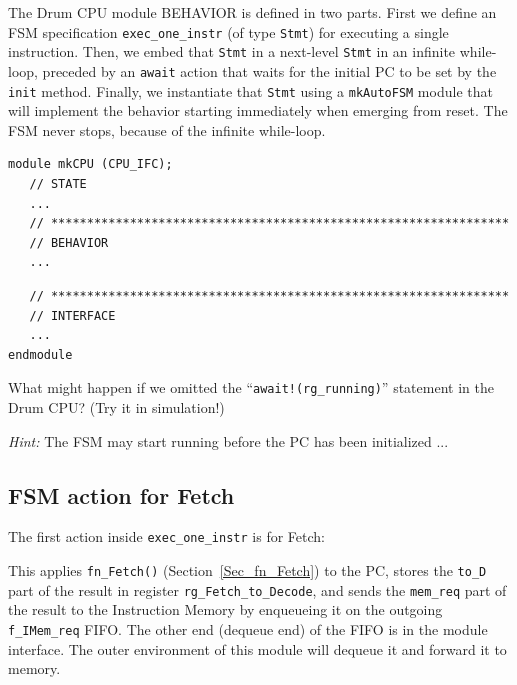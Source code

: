 The Drum CPU module BEHAVIOR is defined in two parts.  First we define
an FSM specification \verb|exec_one_instr| (of type \verb|Stmt|) for
executing a single instruction.  Then, we embed that \verb|Stmt| in a
next-level \verb|Stmt| in an infinite while-loop, preceded by an
\verb|await| action that waits for the initial PC to be set by the
\verb|init| method. Finally, we instantiate that \verb|Stmt| using a
\verb|mkAutoFSM| module that will implement the behavior starting
immediately when emerging from reset.  The FSM never stops, because of
the infinite while-loop.

{\small
\begin{Verbatim}
module mkCPU (CPU_IFC);
   // STATE
   ...
   // ****************************************************************
   // BEHAVIOR
   ...
\end{Verbatim}
}




{\small
\begin{Verbatim}
   // ****************************************************************
   // INTERFACE
   ...
endmodule
\end{Verbatim}
}

\hdivider

\Exercise

What might happen if we omitted the ``{\tt await!(rg\_running)}''
statement in the Drum CPU? (Try it in simulation!)

\emph{Hint:} The FSM may start running before the PC has been initialized ...

\Endexercise


\subsection{FSM action for Fetch}

The first action inside \verb|exec_one_instr| is for Fetch:



This applies \verb|fn_Fetch()| (Section~\ref{Sec_fn_Fetch}) to the PC,
stores the \verb|to_D| part of the result in register
\verb|rg_Fetch_to_Decode|, and sends the \verb|mem_req| part of the
result to the Instruction Memory by enqueueing it on the outgoing
\verb|f_IMem_req| FIFO.  The other end (dequeue end) of the FIFO is in
the module interface.  The outer environment of this module will
dequeue it and forward it to memory.

